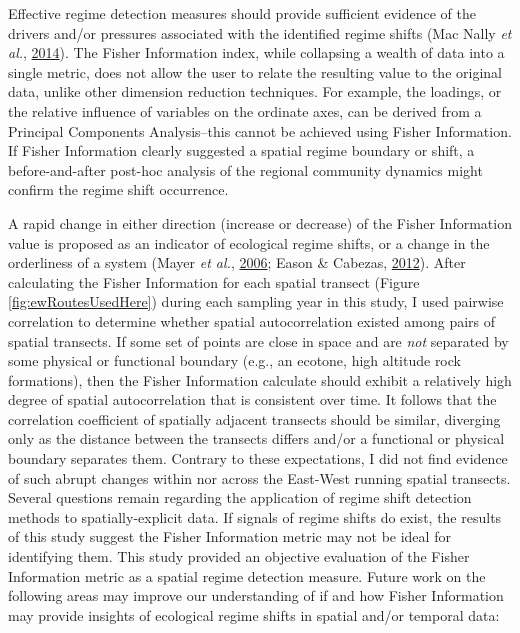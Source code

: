 \documentclass[print]{nuthesis}
\begin{document}
Effective regime detection measures should provide sufficient evidence of the drivers and/or pressures associated with the identified regime shifts (Mac Nally \emph{et al.}, \protect\hyperlink{ref-mac2014scrutiny}{2014}). The Fisher Information index, while collapsing a wealth of data into a single metric, does not allow the user to relate the resulting value to the original data, unlike other dimension reduction techniques. For example, the loadings, or the relative influence of variables on the ordinate axes, can be derived from a Principal Components Analysis--this cannot be achieved using Fisher Information. If Fisher Information clearly suggested a spatial regime boundary or shift, a before-and-after post-hoc analysis of the regional community dynamics might confirm the regime shift occurrence.

A rapid change in either direction (increase or decrease) of the Fisher Information value is proposed as an indicator of ecological regime shifts, or a change in the orderliness of a system (Mayer \emph{et al.}, \protect\hyperlink{ref-mayer_fisher_2006}{2006}; Eason \& Cabezas, \protect\hyperlink{ref-eason_evaluating_2012}{2012}). After calculating the Fisher Information for each spatial transect (Figure \ref{fig:ewRoutesUsedHere}) during each sampling year in this study, I used pairwise correlation to determine whether spatial autocorrelation existed among pairs of spatial transects. If some set of points are close in space and are \emph{not} separated by some physical or functional boundary (e.g., an ecotone, high altitude rock formations), then the Fisher Information calculate should exhibit a relatively high degree of spatial autocorrelation that is consistent over time. It follows that the correlation coefficient of spatially adjacent transects should be similar, diverging only as the distance between the transects differs and/or a functional or physical boundary separates them. Contrary to these expectations, I did not find evidence of such abrupt changes within nor across the East-West running spatial transects. Several questions remain regarding the application of regime shift detection methods to spatially-explicit data. If signals of regime shifts do exist, the results of this study suggest the Fisher Information metric may not be ideal for identifying them. This study provided an objective evaluation of the Fisher Information metric as a spatial regime detection measure. Future work on the following areas may improve our understanding of if and how Fisher Information may provide insights of ecological regime shifts in spatial and/or temporal data:
\end{document}
